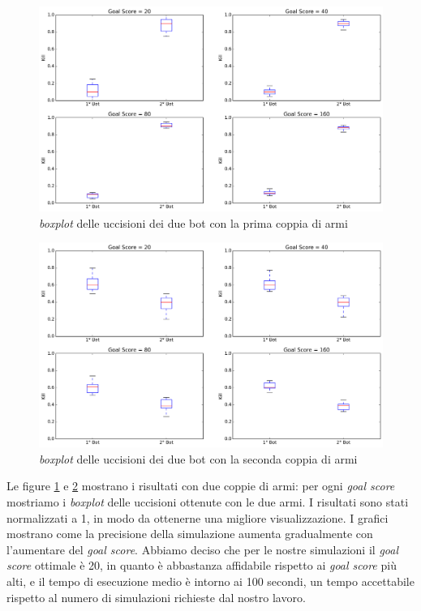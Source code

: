 \documentclass[12pt, italian]{toptesi}
\begin{document}
\begin{figure}[htp]
\centering
\includegraphics[width=1.0\textwidth]{kill_vs_gs_1}
\caption{\emph{boxplot} delle uccisioni dei due bot con la prima coppia di armi}
\label{fig:kill_vs_gs_1}
\end{figure}
\begin{figure}[htp]
\centering
\includegraphics[width=1.0\textwidth]{kill_vs_gs_2}
\caption{\emph{boxplot} delle uccisioni dei due bot con la seconda coppia di armi}
\label{fig:kill_vs_gs_2}
\end{figure}

Le figure \ref{fig:kill_vs_gs_1} e \ref{fig:kill_vs_gs_2} mostrano i risultati con due coppie di armi: per ogni \emph{goal score} mostriamo i \emph{boxplot} delle uccisioni ottenute con le due armi. I risultati sono stati normalizzati a 1, in modo da ottenerne una migliore visualizzazione.
I grafici mostrano come la precisione della simulazione aumenta gradualmente con l'aumentare del \emph{goal score}.
Abbiamo deciso che per le nostre simulazioni il \emph{goal score} ottimale è 20, in quanto è abbastanza affidabile rispetto ai \emph{goal score} più alti, e il tempo di esecuzione medio è intorno ai 100 secondi, un tempo accettabile rispetto al numero di simulazioni richieste dal nostro lavoro.
\end{document}
